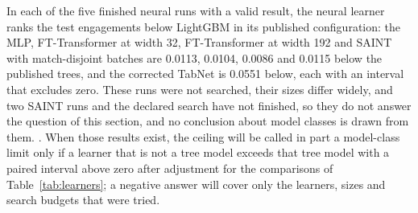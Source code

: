 In each of the five finished neural runs with a valid result, the neural learner ranks the test engagements
below LightGBM in its published configuration: the MLP, FT-Transformer at width 32, FT-Transformer at width
192 and SAINT with match-disjoint batches are 0.0113, 0.0104, 0.0086 and 0.0115 below the published trees,
and the corrected TabNet is 0.0551 below, each with an interval that excludes zero. These runs were not
searched, their sizes differ widely, and two SAINT runs and the declared search have not finished, so they
do not answer the question of this section, and no conclusion about model classes is drawn from them.
. When those results exist, the ceiling will be called in part a model-class limit
only if a learner that is not a tree model exceeds that tree model with a paired interval above zero after
adjustment for the comparisons of Table~\ref{tab:learners}; a negative answer will cover only the learners,
sizes and search budgets that were tried.
